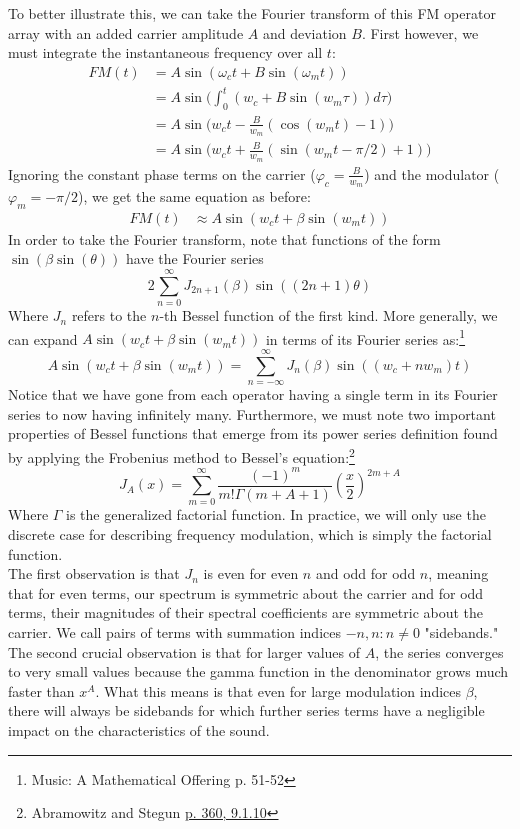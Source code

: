 \documentclass[11pt,twoside]{report}
\newcommand{\w}{\omega}
\numberwithin{thm}{section}
\numberwithin{equation}{section}
\begin{document}
To better illustrate this, we can take the Fourier transform of this FM operator array with an added carrier amplitude $A$ and deviation $B$. First however, we must integrate the instantaneous frequency over all $t$:
\begin{align*}
    FM(t) &= A\sin(\w_ct + B \sin( \w_mt))\\
    &= A\sin\bigg(\int_0^t (w_c + B\sin(w_m \tau))d\tau\bigg)\\
    &= A\sin\bigg( w_ct - \frac{B}{w_m}(\cos(w_m t) - 1)\bigg)\\
    &= A\sin\bigg( w_ct + \frac{B}{w_m}(\sin(w_m t - \pi/2) + 1)\bigg)
\end{align*}
Ignoring the constant phase terms on the carrier ($\varphi_c = \frac{B}{w_m}$) and the modulator ($\varphi_m = -\pi/2$), we get the same equation as before:
\begin{align*}
    FM(t) &\approx A\sin(w_c t + \beta \sin(w_m t))
\end{align*}
In order to take the Fourier transform, note that functions of the form $\sin(\beta\sin(\theta))$ have the Fourier series
$$2\sum_{n=0}^\infty J_{2n+1}(\beta)\sin((2n+1)\theta)$$
Where $J_n$ refers to the $n$-th Bessel function of the first kind. More generally, we can expand $A\sin(w_c t + \beta \sin(w_m t))$ in terms of its Fourier series as:\footnote{Music: A Mathematical Offering p. 51-52}
$$A\sin(w_c t + \beta \sin(w_m t)) = \sum_{n=-\infty}^\infty J_n(\beta)\sin((w_c + nw_m)t)$$
Notice that we have gone from each operator having a single term in its Fourier series to now having infinitely many. Furthermore, we must note two important properties of Bessel functions that emerge from its power series definition found by applying the Frobenius method to Bessel's equation:\footnote{ Abramowitz and Stegun \hyperlink{https://personal.math.ubc.ca/~cbm/aands/page_360.htm}{p. 360, 9.1.10}}
$$J_A(x) = \sum_{m=0}^\infty\frac{(-1)^m}{m!\Gamma(m+A+1)}\left(\frac{x}{2}\right)^{2m+A}$$
Where $\Gamma$ is the generalized factorial function. In practice, we will only use the discrete case for describing frequency modulation, which is simply the factorial function. \\

The first observation is that $J_n$ is even for even $n$ and odd for odd $n$, meaning that for even terms, our spectrum is symmetric about the carrier and for odd terms, their magnitudes of their spectral coefficients are symmetric about the carrier. We call pairs of terms with summation indices $-n,n :n\neq 0$ "sidebands." The second crucial observation is that for larger values of $A$, the series converges to very small values because the gamma function in the denominator grows much faster than $x^A$. What this means is that even for large modulation indices $\beta$, there will always be sidebands for which further series terms have a negligible impact on the characteristics of the sound.
\end{document}

